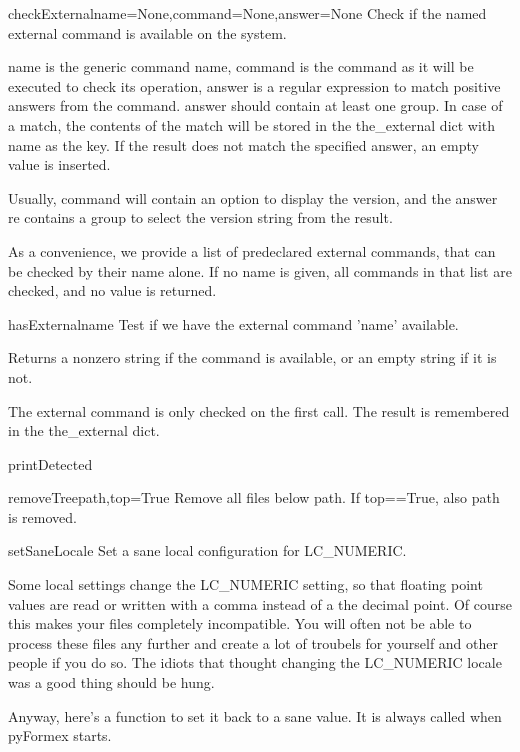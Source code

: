 \begin{funcdesc}{checkExternal}{name=None,command=None,answer=None}
Check if the named external command is available on the system.

    name is the generic command name,
    command is the command as it will be executed to check its operation,
    answer is a regular expression to match positive answers from the command.
    answer should contain at least one group. In case of a match, the
    contents of the match will be stored in the the_external dict
    with name as the key. If the result does not match the specified answer,
    an empty value is inserted.

    Usually, command will contain an option to display the version, and
    the answer re contains a group to select the version string from
    the result.

    As a convenience, we provide a list of predeclared external commands,
    that can be checked by their name alone.
    If no name is given, all commands in that list are checked, and no
    value is returned.
    
\end{funcdesc}

\begin{funcdesc}{hasExternal}{name}
Test if we have the external command 'name' available.

    Returns a nonzero string if the command is available,
    or an empty string if it is not.

    The external command is only checked on the first call.
    The result is remembered in the the_external dict.
    
\end{funcdesc}

\begin{funcdesc}{printDetected}{}

\end{funcdesc}

\begin{funcdesc}{removeTree}{path,top=True}
Remove all files below path. If top==True, also path is removed.
\end{funcdesc}

\begin{funcdesc}{setSaneLocale}{}
Set a sane local configuration for LC_NUMERIC.

    Some local settings change the LC_NUMERIC setting, so that floating
    point values are read or written with a comma instead of a the decimal
    point. Of course this makes your files completely incompatible.
    You will often not be able to process these files any further and
    create a lot of troubels for yourself and other people if you do so.
    The idiots that thought changing the LC_NUMERIC locale was a good thing
    should be hung.

    Anyway, here's a function to set it back to a sane value.
    It is always called when pyFormex starts.
    
\end{funcdesc}

